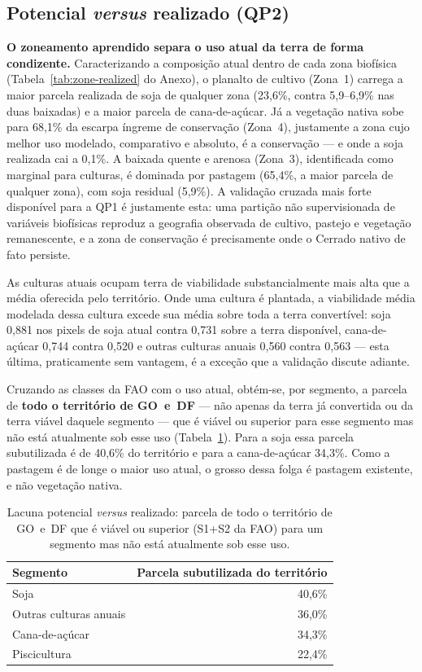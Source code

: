 \subsection{Potencial \emph{versus} realizado (QP2)}\label{sec:pot-vs-real}

\textbf{O zoneamento aprendido separa o uso atual da terra de forma condizente.}
Caracterizando a composição atual dentro de cada zona biofísica
(Tabela~\ref{tab:zone-realized} do Anexo), o planalto de cultivo (Zona~1) carrega a maior
parcela realizada de soja de qualquer zona (23,6\%, contra 5,9--6,9\% nas duas baixadas) e a
maior parcela de cana-de-açúcar. Já a vegetação nativa sobe para 68,1\% da escarpa
íngreme de conservação (Zona~4), justamente a zona cujo melhor uso modelado, comparativo e
absoluto, é a conservação --- e onde a soja realizada cai a 0,1\%. A baixada quente e arenosa
(Zona~3), identificada como marginal para culturas, é dominada por pastagem (65,4\%, a maior
parcela de qualquer zona), com soja residual (5,9\%). A validação
cruzada mais forte disponível para a QP1 é justamente esta: uma partição não supervisionada de
variáveis biofísicas reproduz a geografia observada de cultivo, pastejo e vegetação remanescente,
e a zona de conservação é precisamente onde o Cerrado nativo de fato persiste.

As culturas atuais ocupam terra de viabilidade substancialmente mais alta que a
média oferecida pelo território. Onde uma cultura é plantada, a viabilidade média modelada
dessa cultura excede sua média sobre toda a terra convertível: soja 0,881 nos pixels de soja atual contra 0,731 sobre a terra disponível, cana-de-açúcar 0,744 contra 0,520 e outras
culturas anuais 0,560 contra 0,563 --- esta última, praticamente sem vantagem, é a exceção que a validação discute adiante.

Cruzando as classes da
FAO com o uso atual, obtém-se, por segmento, a parcela de \textbf{todo o território de GO~e~DF}
--- não apenas da terra já convertida ou da terra viável daquele segmento --- que é viável ou
superior para esse segmento mas não está atualmente sob esse uso (Tabela~\ref{tab:pot-real-gap}).
Para a soja essa parcela subutilizada é de 40,6\% do território e para a cana-de-açúcar 34,3\%.
Como a pastagem é de longe o maior uso atual, o grosso dessa folga é pastagem existente, e não
vegetação nativa.

\begin{table}[H]
\centering
\caption{Lacuna potencial \emph{versus} realizado: parcela de todo o território de GO~e~DF que
é viável ou superior (S1+S2 da FAO) para um segmento mas não está atualmente sob esse uso.}
\label{tab:pot-real-gap}
\begin{tabular}{@{}lr@{}}
\toprule
Segmento & Parcela subutilizada do território \\
\midrule
Soja                   & 40,6\% \\
Outras culturas anuais & 36,0\% \\
Cana-de-açúcar         & 34,3\% \\
Piscicultura           & 22,4\% \\
\bottomrule
\end{tabular}
\end{table}

